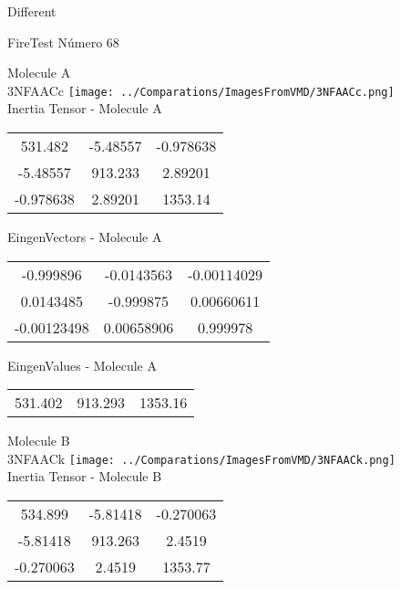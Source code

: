 \begin{center}
\vtab
\vtab
\textcolor{NavyBlue}{\Large Different}
\end{center}

 \newpage

\vtab[-2cm]
\begin{center}
{\large FireTest \tab Número 68}
\end{center}
\begin{multicols}{2}
\begin{center}

Molecule A \\ 
3NFAACc
\texttt{[image: ../Comparations/ImagesFromVMD/3NFAACc.png]}
\\
Inertia Tensor - Molecule A \\
\vtab

\begin{tabular}{|c c c|}
531.482	 & 	-5.48557	 & 	-0.978638	 \\
-5.48557	 & 	913.233	 & 	2.89201	 \\
-0.978638	 & 	2.89201	 & 	1353.14
\end{tabular}

\vtab
 EingenVectors - Molecule A     \\
\vtab
\begin{tabular}{|c c c|}
-0.999896	 & 	-0.0143563	 & 	-0.00114029	 \\
0.0143485	 & 	-0.999875	 & 	0.00660611	 \\
-0.00123498	 & 	0.00658906	 & 	0.999978
\end{tabular}

\vtab
 EingenValues - Molecule A     \\
\vtab
\begin{tabular}{|c c c|}
531.402	 & 	913.293	 & 	1353.16	 \\
\end{tabular}
\columnbreak

Molecule B \\ 
3NFAACk
\texttt{[image: ../Comparations/ImagesFromVMD/3NFAACk.png]}
\\
Inertia Tensor - Molecule B \\
\vtab

\begin{tabular}{|c c c|}
534.899	 & 	-5.81418	 & 	-0.270063	 \\
-5.81418	 & 	913.263	 & 	2.4519	 \\
-0.270063	 & 	2.4519	 & 	1353.77
\end{tabular}


\end{center}
\end{multicols}
